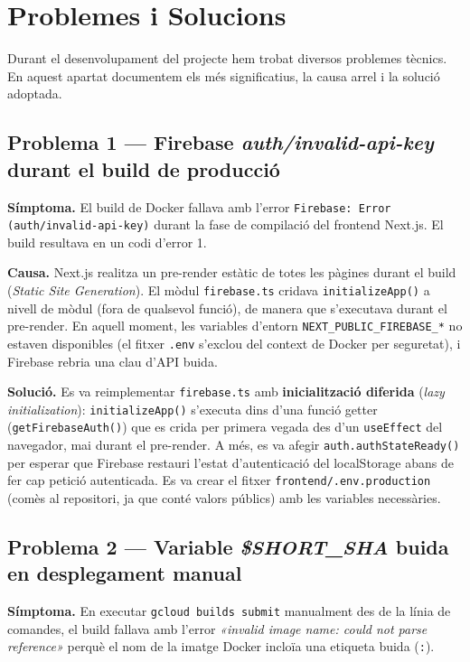 \section{Problemes i Solucions}
\label{sec:problemes}

Durant el desenvolupament del projecte hem trobat diversos problemes tècnics. En aquest apartat documentem els més significatius, la causa arrel i la solució adoptada.

\subsection*{Problema 1 — Firebase \textit{auth/invalid-api-key} durant el build de producció}

\textbf{Símptoma.} El build de Docker fallava amb l'error \texttt{Firebase: Error (auth/invalid-api-key)} durant la fase de compilació del frontend Next.js. El build resultava en un codi d'error 1.

\textbf{Causa.} Next.js realitza un pre-render estàtic de totes les pàgines durant el build (\textit{Static Site Generation}). El mòdul \texttt{firebase.ts} cridava \texttt{initializeApp()} a nivell de mòdul (fora de qualsevol funció), de manera que s'executava durant el pre-render. En aquell moment, les variables d'entorn \texttt{NEXT\_PUBLIC\_FIREBASE\_*} no estaven disponibles (el fitxer \texttt{.env} s'exclou del context de Docker per seguretat), i Firebase rebria una clau d'API buida.

\textbf{Solució.} Es va reimplementar \texttt{firebase.ts} amb \textbf{inicialització diferida} (\textit{lazy initialization}): \texttt{initializeApp()} s'executa dins d'una funció getter (\texttt{getFirebaseAuth()}) que es crida per primera vegada des d'un \texttt{useEffect} del navegador, mai durant el pre-render. A més, es va afegir \texttt{auth.authStateReady()} per esperar que Firebase restauri l'estat d'autenticació del localStorage abans de fer cap petició autenticada. Es va crear el fitxer \texttt{frontend/.env.production} (comès al repositori, ja que conté valors públics) amb les variables necessàries.

\subsection*{Problema 2 — Variable \textit{\$SHORT\_SHA} buida en desplegament manual}

\textbf{Símptoma.} En executar \texttt{gcloud builds submit} manualment des de la línia de comandes, el build fallava amb l'error \textit{«invalid image name: could not parse reference»} perquè el nom de la imatge Docker incloïa una etiqueta buida (\texttt{:}).

